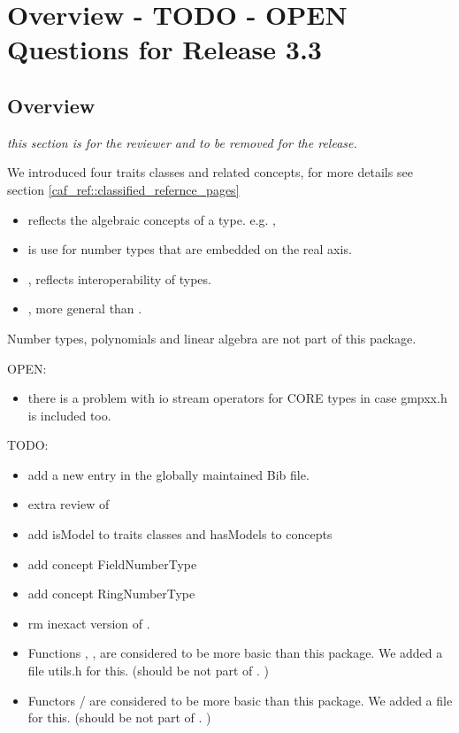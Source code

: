 \section{Overview - TODO - OPEN Questions for Release 3.3}

\subsection{Overview}
{\em this section is for the reviewer and to be removed for the release. }

We introduced four traits classes and related concepts, for more details see 
section \ref{caf_ref::classified_refernce_pages}
\begin{itemize}
\item {} reflects the algebraic concepts of a 
      type. e.g. , 
\item {} is use for number types that are embedded on 
      the real axis. 
\item {}, reflects interoperability of types. 
\item {}, more general than .
\end{itemize}

Number types, polynomials and linear algebra are not part of this package. 

OPEN:
\begin{itemize}
\item there is a problem with io stream operators for CORE types in case 
      gmpxx.h is included too. 
\end{itemize}

TODO:
\begin{itemize} 
\item add a new entry in the globally maintained Bib file.
\item extra review of 
\item add isModel to traits classes and hasModels to concepts 
\item add concept FieldNumberType
\item add concept RingNumberType 
\item rm inexact version of . 
\item Functions , ,  are considered to be more 
      basic than this package. We added a file utils.h for this. 
      (should be not part of . )
\item Functors / are considered to be more basic than 
      this package. We added a file  for this. 
      (should be not part of . )   
\end{itemize}


